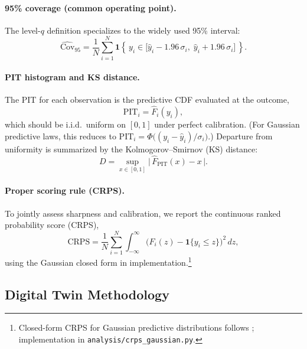 \documentclass{article}
\begin{document}
\paragraph{95\% coverage (common operating point).}
The level-$q$ definition specializes to the widely used 95\% interval:
\begin{equation}
\widehat{\mathrm{Cov}}_{95}
= \frac{1}{N}\sum_{i=1}^{N}
\mathbf{1}\!\left\{\,y_i \in \bigl[\hat{y}_i - 1.96\,\sigma_i,\; \hat{y}_i + 1.96\,\sigma_i\bigr]\,\right\}.
\label{eq:coverage}
\end{equation}

\paragraph{PIT histogram and KS distance.}
The PIT for each observation is the predictive CDF evaluated at the outcome,
\begin{equation}
\mathrm{PIT}_i = \hat{F}_i(y_i),
\label{eq:pit}
\end{equation}
which should be i.i.d.\ uniform on $[0,1]$ under perfect calibration. (For Gaussian predictive laws, this reduces to $\mathrm{PIT}_i=\Phi\!\big((y_i-\hat{y}_i)/\sigma_i\big)$.) Departure from uniformity is summarized by the Kolmogorov–Smirnov (KS) distance:
\begin{equation}
D = \sup_{x \in [0,1]} \bigl|\,\hat{F}_{\mathrm{PIT}}(x) - x\,\bigr|.
\label{eq:ks}
\end{equation}

\paragraph{Proper scoring rule (CRPS).}
To jointly assess sharpness and calibration, we report the continuous ranked probability score (CRPS),
\begin{equation}
\mathrm{CRPS}
= \frac{1}{N}\sum_{i=1}^{N}
\int_{-\infty}^{\infty}
\bigl(F_i(z) - \mathbf{1}\{y_i \le z\}\bigr)^2\,dz,
\label{eq:crps}
\end{equation}
using the Gaussian closed form in implementation.\footnote{Closed-form CRPS for Gaussian predictive distributions follows \citep{Gneiting2007CRPS}; implementation in \texttt{analysis/crps\_gaussian.py}.}



\subsection{Digital Twin Methodology}
\label{sec:digital-twin-methodology}
\end{document}
